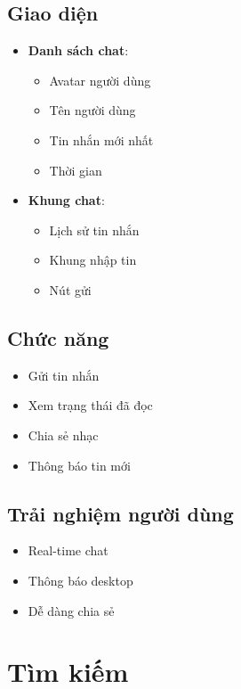 \documentclass{article}
\begin{document}
\subsection{Giao diện}
\begin{itemize}
    \item \textbf{Danh sách chat}:
    \begin{itemize}
        \item Avatar người dùng
        \item Tên người dùng
        \item Tin nhắn mới nhất
        \item Thời gian
    \end{itemize}
    \item \textbf{Khung chat}:
    \begin{itemize}
        \item Lịch sử tin nhắn
        \item Khung nhập tin
        \item Nút gửi
    \end{itemize}
\end{itemize}

\subsection{Chức năng}
\begin{itemize}
    \item Gửi tin nhắn
    \item Xem trạng thái đã đọc
    \item Chia sẻ nhạc
    \item Thông báo tin mới
\end{itemize}

\subsection{Trải nghiệm người dùng}
\begin{itemize}
    \item Real-time chat
    \item Thông báo desktop
    \item Dễ dàng chia sẻ
\end{itemize}

\section{Tìm kiếm}
\end{document}
